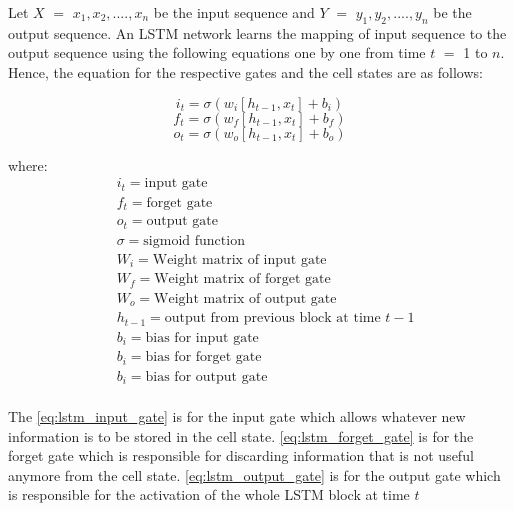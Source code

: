 Let $X$ $=$ ${x_{1}, x_{2},....,x_{n}}$ be the input sequence and $Y$ $=$ ${y_{1}, y_{2},....,y_{n}}$ be the output sequence. An LSTM network learns the mapping of input sequence to the output sequence using the following equations one by one from time $t$ $=$ 1 to $n$. Hence, the equation for the respective gates and the cell states are as follows:

\begin{equation} \label{eq:lstm_input_gate}
    i_{t} =\sigma(w_{i}[h_{t-1},x_{t}]+b_{i})
\end{equation}
\begin{equation}\label{eq:lstm_forget_gate}
    f_{t} =\sigma(w_{f}[h_{t-1},x_{t}]+b_{f})
\end{equation}
\begin{equation}\label{eq:lstm_output_gate}
    o_{t} = \sigma(w_{o}[h_{t-1},x_{t}]+b_{o})
\end{equation}

where:
\begin{align*}
      & i_{t}=\text{input gate}\\
      & f_{t}=\text{forget gate}\\
      & o_{t}=\text{output gate}\\
      & \sigma=\text{sigmoid function}\\
      & W_{i}=\text{Weight matrix of input gate}\\
      & W_{f}=\text{Weight matrix of forget gate}\\
      & W_{o}=\text{Weight matrix of output gate}\\
      & h_{t-1}=\text{output from previous block at time $t-1$}      \\
      & b_{i}=\text{bias for input gate}    \\
      & b_{i}=\text{bias for forget gate}    \\
      & b_{i}=\text{bias for output gate}\\
\end{align*}

The \ref{eq:lstm_input_gate} is for the input gate which allows whatever new information is to be stored in the cell state. \ref{eq:lstm_forget_gate} is for the forget gate which is responsible for discarding information that is not useful anymore from the cell state. \ref{eq:lstm_output_gate} is for the output gate which is responsible for the activation of the whole LSTM block at time $t$ 


